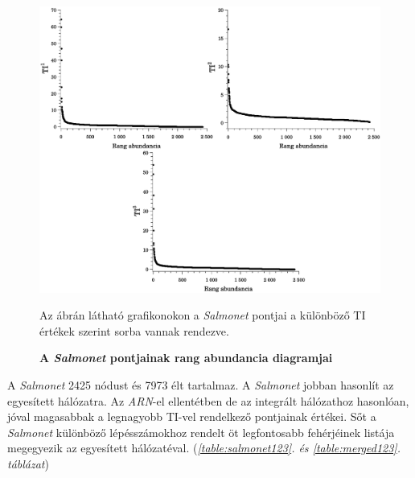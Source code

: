 \documentclass[a4paper,12pt]{article}
\newenvironment{imgdesc}{
		\small
		\singlespacing
		\begin{center}
		
	}{
		\end{center}	
	}
\begin{document}
			\begin{figure}[H]
					\includegraphics[scale=0.44]{img/salmonet_tis.pdf}
					\centering
					\caption{ \textbf{A \textit{Salmonet} pontjainak rang abundancia diagramjai}}
					\begin{imgdesc}
						Az ábrán látható grafikonokon a \textit{Salmonet} pontjai a különböző TI értékek szerint sorba vannak rendezve. 
					\end{imgdesc}
		
					\label{fig:salmonet_stats}			 		 
				\end{figure}
		
			A \textit{Salmonet} 2425 nódust és 7973 élt tartalmaz. A \textit{Salmonet} jobban hasonlít az egyesített hálózatra. Az \textit{ARN}-el ellentétben de az integrált hálózathoz hasonlóan, jóval  magasabbak a legnagyobb TI-vel rendelkező pontjainak értékei. Sőt a \textit{Salmonet} különböző lépésszámokhoz rendelt öt legfontosabb fehérjéinek listája megegyezik az egyesített hálózatéval. (\textit{\ref{table:salmonet123}. és \ref{table:merged123}. táblázat}) 
										
\end{document}
